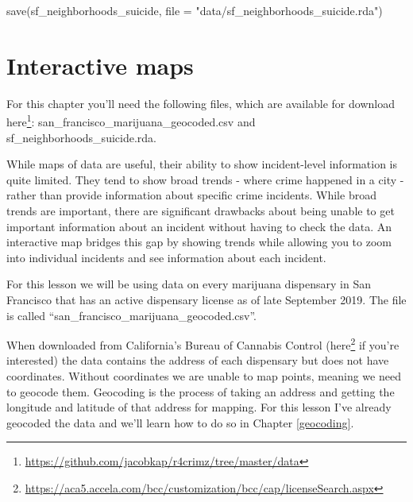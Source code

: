 \documentclass[
]{krantz}
\makeatletter
\newenvironment{Shaded}{\begin{snugshade}}{\end{snugshade}}
\newcommand{\AttributeTok}[1]{\textcolor[rgb]{0.61,0.61,0.61}{#1}}
\newcommand{\FunctionTok}[1]{\textcolor[rgb]{0,0,0}{#1}}
\newcommand{\NormalTok}[1]{#1}
\newcommand{\StringTok}[1]{\textcolor[rgb]{0.5,0.5,0.5}{#1}}
\renewcommand{\href}[2]{#2\footnote{\url{#1}}}
\newenvironment{kframe}{%
\medskip{}
\setlength{\fboxsep}{.8em}
 \def\at@end@of@kframe{}%
 \ifinner\ifhmode%
  \def\at@end@of@kframe{\end{minipage}}%
  \begin{minipage}{\columnwidth}%
 \fi\fi%
 \def\FrameCommand##1{\hskip\@totalleftmargin \hskip-\fboxsep
 \colorbox{shadecolor}{##1}\hskip-\fboxsep
     \hskip-\linewidth \hskip-\@totalleftmargin \hskip\columnwidth}%
 \MakeFramed {\advance\hsize-\width
   \@totalleftmargin\z@ \linewidth\hsize
   \@setminipage}}%
 {\par\unskip\endMakeFramed%
 \at@end@of@kframe}
\renewenvironment{Shaded}{\begin{kframe}}{\end{kframe}}
\makeatother
\begin{document}
\begin{Shaded}
\begin{Highlighting}[]
\FunctionTok{save}\NormalTok{(sf\_neighborhoods\_suicide, }\AttributeTok{file =} \StringTok{"data/sf\_neighborhoods\_suicide.rda"}\NormalTok{)}
\end{Highlighting}
\end{Shaded}

\hypertarget{interactive-maps}{%
\chapter{Interactive maps}\label{interactive-maps}}

For this chapter you'll need the following files, which are available for download \href{https://github.com/jacobkap/r4crimz/tree/master/data}{here}: san\_francisco\_marijuana\_geocoded.csv and sf\_neighborhoods\_suicide.rda.

While maps of data are useful, their ability to show incident-level information is quite limited. They tend to show broad trends - where crime happened in a city - rather than provide information about specific crime incidents. While broad trends are important, there are significant drawbacks about being unable to get important information about an incident without having to check the data. An interactive map bridges this gap by showing trends while allowing you to zoom into individual incidents and see information about each incident.

For this lesson we will be using data on every marijuana dispensary in San Francisco that has an active dispensary license as of late September 2019. The file is called ``san\_francisco\_marijuana\_geocoded.csv''.

When downloaded from California's Bureau of Cannabis Control (\href{https://aca5.accela.com/bcc/customization/bcc/cap/licenseSearch.aspx}{here} if you're interested) the data contains the address of each dispensary but does not have coordinates. Without coordinates we are unable to map points, meaning we need to
geocode them. Geocoding is the process of taking an address and getting the longitude and latitude of that address for mapping. For this lesson I've already geocoded the data and we'll learn how to do so in Chapter \ref{geocoding}.
\end{document}

